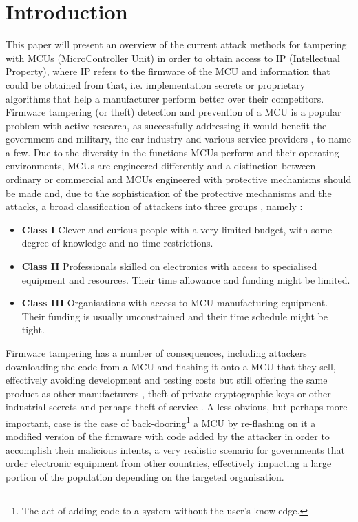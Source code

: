 \section{Introduction}
	This paper will present an overview of the current attack methods for tampering with MCUs (MicroController Unit) in order to obtain access to IP (Intellectual Property), where IP refers to the firmware of the MCU and information that could be obtained from that, i.e. implementation secrets or proprietary algorithms that help a manufacturer perform better over their competitors. Firmware tampering (or theft) detection and prevention of a MCU is a popular problem with active research, as successfully addressing it would benefit the government and military, the car industry and various service providers \citep{sergei:thesis}, to name a few. Due to the diversity in the functions MCUs perform and their operating environments, MCUs are engineered differently and a distinction between ordinary or commercial and MCUs engineered with protective mechanisms should be made\citep{sergei:thesis} and, due to the sophistication of the protective mechanisms and the attacks, a broad classification of attackers into three groups \cite{anderson:cautionary_note}, namely :
		\begin{itemize}
			\item \textbf{Class I} Clever and curious people with a very limited budget, with some degree of knowledge and no time restrictions.\\
			\item \textbf{Class II} Professionals skilled on electronics with access to specialised equipment and resources. Their time allowance and funding might be limited.\\
			\item \textbf{Class III} Organisations with access to MCU manufacturing equipment. Their funding is usually unconstrained and their time schedule might be tight.
		\end{itemize}
	
	Firmware tampering has a number of consequences, including attackers downloading the code from a MCU and flashing it onto a MCU that they sell, effectively avoiding development and testing costs but still offering the same product as other manufacturers \cite{tech:aes_bls}, theft of private cryptographic keys or other industrial secrets and perhaps theft of service \citep{sergei:thesis}. A less obvious, but perhaps more important, case is the case of back-dooring\footnote{The act of adding code to a system without the user's knowledge.} a MCU by re-flashing on it a modified version of the firmware with code added by the attacker in order to accomplish their malicious intents, a very realistic scenario for governments that order electronic equipment from other countries, effectively impacting a large portion of the population depending on the targeted organisation.


